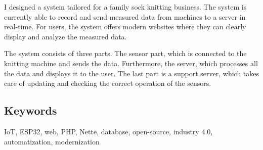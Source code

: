 \documentclass{template/socthesis}
\begin{document}
I designed a system tailored for a family sock knitting business. The system is currently able to record and send measured data from machines to a server in real-time. 
For users, the system offers modern websites where they can clearly display and analyze the measured data.

The system consists of three parts. The sensor part, which is connected to the knitting machine and sends the data. 
Furthermore, the server, which processes all the data and displays it to the user. The last part is a support server, which takes care of updating and checking the correct operation of the sensors.  

\subsection*{Keywords}
IoT, ESP32, web, PHP, Nette, database, open-source, industry 4.0, automatization, modernization

\newpage
\pagestyle{plain}

\tableofcontents %

\setcounter{figure}{0}
\setcounter{table}{0}
\newpage



% 















 












% 





\newpage



\appendix
{}






% 


% 


% 



\printbibliography[title=Literatura]


\listoffigures
{}

\listoftables
{}
\end{document}
